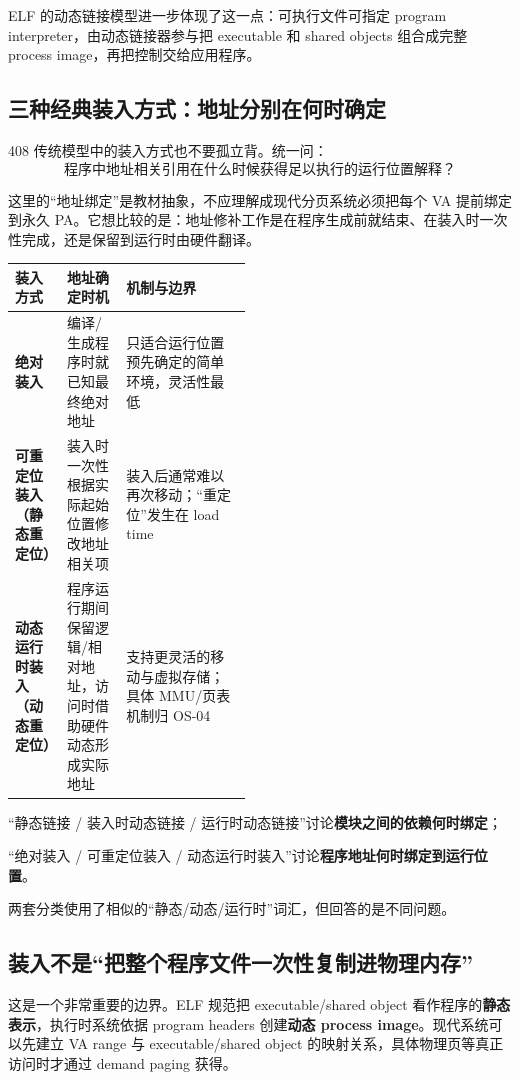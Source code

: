 \documentclass[11pt,a4paper]{ctexart}
\newcommand{\kw}[1]{\textbf{#1}}
\begin{document}
ELF 的动态链接模型进一步体现了这一点：可执行文件可指定 program interpreter，由动态链接器参与把 executable 和 shared objects 组合成完整 process image，再把控制交给应用程序。

\subsection{三种经典装入方式：地址分别在何时确定}

408 传统模型中的装入方式也不要孤立背。统一问：
\[
\boxed{\text{程序中地址相关引用在什么时候获得足以执行的运行位置解释？}}
\]

这里的“地址绑定”是教材抽象，不应理解成现代分页系统必须把每个 VA 提前绑定到永久 PA。它想比较的是：地址修补工作是在程序生成前就结束、在装入时一次性完成，还是保留到运行时由硬件翻译。

\begin{center}
\small
\renewcommand{\arraystretch}{1.25}
\begin{tabularx}{\linewidth}{>{\bfseries}p{0.22\linewidth} p{0.25\linewidth} X}
\toprule
装入方式 & 地址确定时机 & 机制与边界\\
\midrule
绝对装入 & 编译/生成程序时就已知最终绝对地址 & 只适合运行位置预先确定的简单环境，灵活性最低\\
可重定位装入（静态重定位） & 装入时一次性根据实际起始位置修改地址相关项 & 装入后通常难以再次移动；“重定位”发生在 load time\\
动态运行时装入（动态重定位） & 程序运行期间保留逻辑/相对地址，访问时借助硬件动态形成实际地址 & 支持更灵活的移动与虚拟存储；具体 MMU/页表机制归 OS-04\\
\bottomrule
\end{tabularx}
\end{center}

\begin{warn}
“静态链接 / 装入时动态链接 / 运行时动态链接”讨论\kw{模块之间的依赖何时绑定}；

“绝对装入 / 可重定位装入 / 动态运行时装入”讨论\kw{程序地址何时绑定到运行位置}。

两套分类使用了相似的“静态/动态/运行时”词汇，但回答的是不同问题。
\end{warn}

\subsection{装入不是“把整个程序文件一次性复制进物理内存”}

这是一个非常重要的边界。ELF 规范把 executable/shared object 看作程序的\kw{静态表示}，执行时系统依据 program headers 创建\kw{动态 process image}。现代系统可以先建立 VA range 与 executable/shared object 的映射关系，具体物理页等真正访问时才通过 demand paging 获得。
\end{document}
